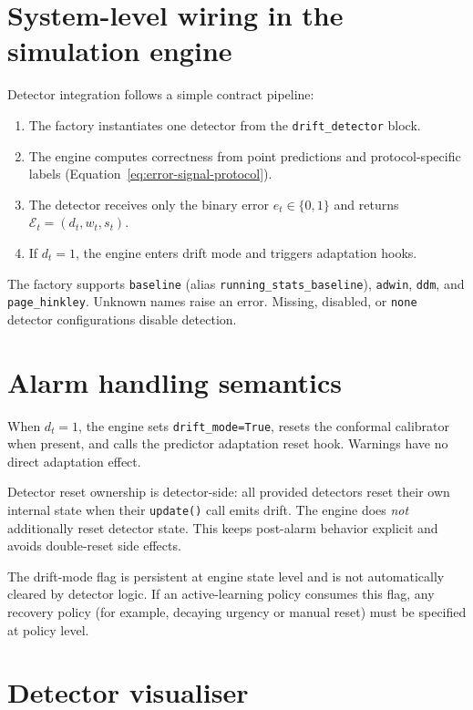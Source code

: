 \section{System-level wiring in the simulation engine}
\label{sec:detector-wiring}

Detector integration follows a simple contract pipeline:
\begin{enumerate}
\item The factory instantiates one detector from the \texttt{drift\_detector} block.
\item The engine computes correctness from point predictions and protocol-specific labels (Equation~\eqref{eq:error-signal-protocol}).
\item The detector receives only the binary error $e_t\in\{0,1\}$ and returns $\mathcal{E}_t=(d_t,w_t,s_t)$.
\item If $d_t=1$, the engine enters drift mode and triggers adaptation hooks.
\end{enumerate}

The factory supports \texttt{baseline} (alias \texttt{running\_stats\_baseline}), \texttt{adwin}, \texttt{ddm}, and \texttt{page\_hinkley}. Unknown names raise an error. Missing, disabled, or \texttt{none} detector configurations disable detection.

\section{Alarm handling semantics}
\label{sec:alarm-handling}

When $d_t=1$, the engine sets \texttt{drift\_mode=True}, resets the conformal calibrator when present, and calls the predictor adaptation reset hook. Warnings have no direct adaptation effect.

Detector reset ownership is detector-side: all provided detectors reset their own internal state when their \texttt{update()} call emits drift. The engine does \emph{not} additionally reset detector state. This keeps post-alarm behavior explicit and avoids double-reset side effects.

The drift-mode flag is persistent at engine state level and is not automatically cleared by detector logic. If an active-learning policy consumes this flag, any recovery policy (for example, decaying urgency or manual reset) must be specified at policy level.

\section{Detector visualiser}
\label{sec:detector-visualiser}

